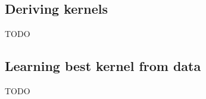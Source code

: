 \subsection{Deriving kernels \cite{deriving-kernels}}
TODO

\subsection{Learning best kernel from data \cite{choosing-kernels}}
TODO

% 
% 
% 
% 
% 
% 



% 
% 
% 
% 

